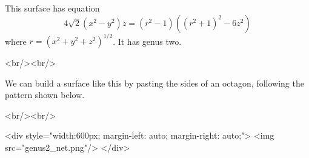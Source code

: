 This surface has equation
$$ 4\sqrt{2}(x^2-y^2)z = (r^2-1)((r^2+1)^2-6z^2) $$
where $r=(x^2+y^2+z^2)^{1/2}$.  It has genus two.

<br/><br/>

We can build a surface like this by pasting the sides of an octagon,
following the pattern shown below.

<br/><br/>

<div style="width:600px; margin-left: auto; margin-right: auto;">
<img src="genus2_net.png"/>
</div>
